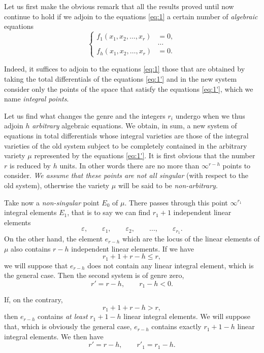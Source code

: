 \documentclass[leqno,11pt]{book}
\makeatletter
\theoremstyle{shape1}
\theoremstyle{shapesmall}
\let\old@epsilon\epsilon
\let\old@varepsilon\varepsilon
\let\epsilon\old@varepsilon
\let\varepsilon\old@epsilon
\makeatother
\begin{document}
Let us first make the obvious remark that all the results proved until now continue to hold if we adjoin to the equations \eqref{eq:1} a certain number of \emph{algebraic} equations
\begin{equation}
  \label{eq:1'}\tag{1$'$}
  \left\{
    \begin{aligned}
      f_{1}(x_{1},x_{2},\dots,x_{r})&=0,\\
      &\dots\\
      f_{h}(x_{1},x_{2},\dots,x_{r})&=0.      
    \end{aligned}
  \right.
\end{equation}

Indeed, it suffices to adjoin to the equations \eqref{eq:1} those that are obtained by taking the total differentials of the equations \eqref{eq:1'} and in the new system consider only the points of the space that satisfy the equations \eqref{eq:1'}, which we name \emph{integral points}.

Let us find what changes the genre and the integers $r_{i}$ undergo when we thus adjoin $h$ \emph{arbitrary} algebraic equations. We obtain, in sum, a new system of equations in total differentials whose integral varieties are those of the integral varieties of the old system subject to be completely contained in the arbitrary variety $\mu$ represented by the equations \eqref{eq:1'}. It is first obvious that the number $r$ is reduced by $h$ units. In other words there are no more than $\infty^{r-h}$ points to consider. \emph{We assume that these points are not all singular} (with respect to the old system), otherwise the variety $\mu$ will be said to be \emph{non-arbitrary}.

Take now a \emph{non-singular} point $E_{0}$ of $\mu$. There passes through this point $\infty^{r_{1}}$ integral elements $E_{1}$, that is to say we can find $r_{1}+1$ independent linear elements
\[
\epsilon,\qquad\epsilon_{1},\qquad\epsilon_{2},\qquad\dots,\qquad\epsilon_{r_{1}}.
\]
On the other hand, the element $e_{r-h}$ which are the locus of the linear elements of $\mu$ also contains $r-h$ independent linear elements. If we have
\[
r_{1}+1+r-h\le r,
\]
we will suppose that $e_{r-h}$ does not contain any linear integral element, which is the general case. Then the second system is of genre zero,
\[
r'=r-h,\qquad r_{1}-h<0.
\]

If, on the contrary,
\[
r_{1}+1+r-h>r,
\]
then $e_{r-h}$ contains \emph{at least} $r_{1}+1-h$ linear integral elements. We will suppose that, which is obviously the general case, $e_{r-h}$ contains exactly $r_{1}+1-h$ linear integral elements. We then have
\[
r'=r-h,\qquad r'_{1}=r_{1}-h.
\]
\end{document}
